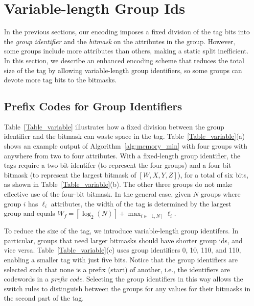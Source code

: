 \section{Variable-length Group Ids}
\label{sec:identifiers}
In the previous sections, our encoding imposes a fixed division of the
tag bits into the \emph{group identifier} and the \emph{bitmask} on
the attributes in the group.  However, some groups include more
attributes than others, making a static split inefficient. In this
section, we describe an enhanced encoding scheme that reduces the
total size of the tag by allowing variable-length group identifiers,
so some groups can devote more tag bits to the bitmasks.

\subsection{Prefix Codes for Group Identifiers}
Table~\ref{Table_variable} illustrates how a fixed division between
the group identifier and the bitmask can waste space in the tag.
Table~\ref{Table_variable}(a) shows an example output of
Algorithm~\ref{alg:memory_min} with four groups with anywhere from two
to four attributes.  With a fixed-length group identifier, the tags
require a two-bit identifer (to represent the four groups) and a
four-bit bitmask (to represent the largest bitmask of $[W,X,Y,Z]$),
for a total of six bits, as shown in Table~\ref{Table_variable}(b).
The other three groups do not make effective use of the four-bit
bitmask.  In the general case, given $N$ groups where group $i$ has
$\ell_i$ attributes, the width of the tag is determined by the largest
group and equals $W_{f} = \left \lceil \log_2(N) \right \rceil +
\max_{i \in [1,N]} \ell_i$.

To reduce the size of the tag, we introduce variable-length group
identifers.  In particular, groups that need larger bitmasks should
have shorter group ids, and vice versa.  Table~\ref{Table_variable}(c)
uses group identifiers 0, 10, 110, and 110, enabling a smaller tag with
just five bits.  Notice that the group identifiers are selected such
that none is a prefix (start) of another, i.e., the identifiers are
codewords in a \emph{prefix code}.  Selecting the group identifiers in
this way allows the switch rules to distinguish between the groups
for any values for their bitmasks in the second part of the tag.

%
%

